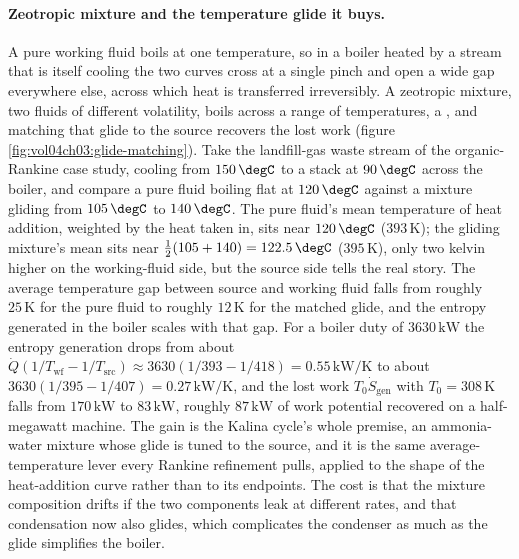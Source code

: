 \paragraph{Zeotropic mixture and the temperature glide it buys.} A pure working
fluid boils at one temperature, so in a boiler heated by a stream that is itself
cooling the two curves cross at a single pinch and open a wide gap everywhere
else, across which heat is transferred irreversibly. A zeotropic mixture, two
fluids of different volatility, boils across a range of temperatures, a
, and matching that glide to the source recovers the lost work
(figure \ref{fig:vol04ch03:glide-matching}). Take the landfill-gas waste stream
of the organic-Rankine case study, cooling from $150\,\degC$ to a stack at
$90\,\degC$ across the boiler, and compare a pure fluid boiling flat at
$120\,\degC$ against a mixture gliding from $105\,\degC$ to $140\,\degC$. The
pure fluid's mean temperature of heat addition, weighted by the heat taken in,
sits near $120\,\degC$ ($393\,\si{\kelvin}$); the gliding mixture's mean sits
near $\tfrac12(105 + 140) = 122.5\,\degC$ ($395\,\si{\kelvin}$), only two kelvin
higher on the working-fluid side, but the source side tells the real story. The
average temperature gap between source and working fluid falls from roughly
$25\,\si{\kelvin}$ for the pure fluid to roughly $12\,\si{\kelvin}$ for the
matched glide, and the entropy generated in the boiler scales with that gap. For
a boiler duty of $3630\,\text{kW}$ the entropy generation drops from about
$\dot Q(1/T_{\text{wf}} - 1/T_{\text{src}}) \approx 3630(1/393 - 1/418) =
0.55\,\text{kW}/\si{\kelvin}$ to about $3630(1/395 - 1/407) = 0.27\,\text{kW}/
\si{\kelvin}$, and the lost work $T_0 \dot S_{\text{gen}}$ with $T_0 =
308\,\si{\kelvin}$ falls from $170\,\text{kW}$ to $83\,\text{kW}$, roughly
$87\,\text{kW}$ of work potential recovered on a half-megawatt machine. The gain
is the Kalina cycle's whole premise, an ammonia-water mixture whose glide is
tuned to the source, and it is the same average-temperature lever every Rankine
refinement pulls, applied to the shape of the heat-addition curve rather than to
its endpoints. The cost is that the mixture composition drifts if the two
components leak at different rates, and that condensation now also glides, which
complicates the condenser as much as the glide simplifies the boiler.





